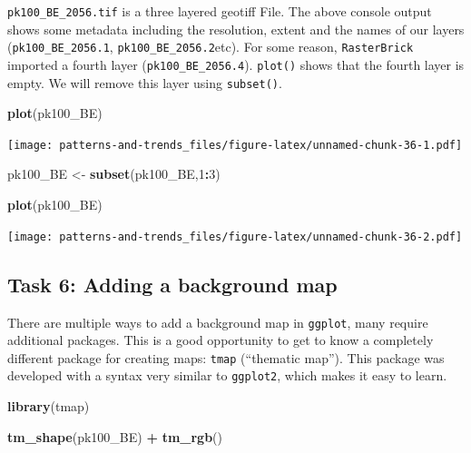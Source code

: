 \documentclass[]{book}
\newenvironment{Shaded}{\begin{snugshade}}{\end{snugshade}}
\newcommand{\KeywordTok}[1]{\textcolor[rgb]{0.13,0.29,0.53}{\textbf{#1}}}
\newcommand{\DecValTok}[1]{\textcolor[rgb]{0.00,0.00,0.81}{#1}}
\newcommand{\StringTok}[1]{\textcolor[rgb]{0.31,0.60,0.02}{#1}}
\newcommand{\OperatorTok}[1]{\textcolor[rgb]{0.81,0.36,0.00}{\textbf{#1}}}
\newcommand{\NormalTok}[1]{#1}
\begin{document}
\texttt{pk100\_BE\_2056.tif} is a three layered geotiff File. The above
console output shows some metadata including the resolution, extent and
the names of our layers (\texttt{pk100\_BE\_2056.1},
\texttt{pk100\_BE\_2056.2}etc). For some reason, \texttt{RasterBrick}
imported a fourth layer (\texttt{pk100\_BE\_2056.4}). \texttt{plot()}
shows that the fourth layer is empty. We will remove this layer using
\texttt{subset()}.

\begin{Shaded}
\begin{Highlighting}[]

\KeywordTok{plot}\NormalTok{(pk100_BE)}
\end{Highlighting}
\end{Shaded}

\texttt{[image: patterns-and-trends\_files/figure-latex/unnamed-chunk-36-1.pdf]}

\begin{Shaded}
\begin{Highlighting}[]

\NormalTok{pk100_BE <-}\StringTok{ }\KeywordTok{subset}\NormalTok{(pk100_BE,}\DecValTok{1}\OperatorTok{:}\DecValTok{3}\NormalTok{)}

\KeywordTok{plot}\NormalTok{(pk100_BE)}
\end{Highlighting}
\end{Shaded}

\texttt{[image: patterns-and-trends\_files/figure-latex/unnamed-chunk-36-2.pdf]}

\subsection{Task 6: Adding a background
map}\label{task-6-adding-a-background-map}

There are multiple ways to add a background map in \texttt{ggplot}, many
require additional packages. This is a good opportunity to get to know a
completely different package for creating maps: \texttt{tmap}
(``thematic map''). This package was developed with a syntax very
similar to \texttt{ggplot2}, which makes it easy to learn.

\begin{Shaded}
\begin{Highlighting}[]
\KeywordTok{library}\NormalTok{(tmap)}


\KeywordTok{tm_shape}\NormalTok{(pk100_BE) }\OperatorTok{+}\StringTok{ }
\StringTok{  }\KeywordTok{tm_rgb}\NormalTok{() }
\end{Highlighting}
\end{Shaded}
\end{document}
